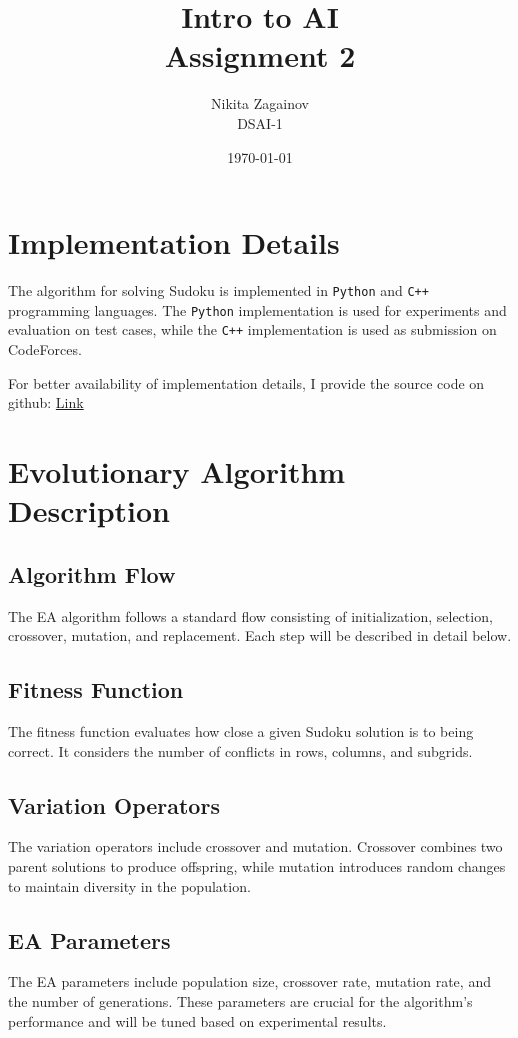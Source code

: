 \documentclass[12pt]{article}
\title{Intro to AI \\ Assignment 2}
\author{Nikita Zagainov \\ DSAI-1}
\date{\today}
\begin{document}
\maketitle

\section{Implementation Details}
The algorithm for solving Sudoku is implemented in
\texttt{Python} and \texttt{C++} programming languages. 
The \texttt{Python} implementation is used for experiments 
and evaluation on test cases, while the \texttt{C++} 
implementation is used as submission on CodeForces.

For better availability of implementation details,
I provide the source code on github: 
\href{https}{Link}

\section{Evolutionary Algorithm Description}
\subsection{Algorithm Flow}
The EA algorithm follows a standard flow 
consisting of initialization, selection, crossover, 
mutation, and replacement. Each step will be 
described in detail below.

\subsection{Fitness Function}
The fitness function evaluates how close a 
given Sudoku solution is to being correct. 
It considers the number of conflicts in rows, 
columns, and subgrids.

\subsection{Variation Operators}
The variation operators include crossover and 
mutation. Crossover combines two parent solutions 
to produce offspring, while mutation introduces 
random changes to maintain diversity in the 
population.

\subsection{EA Parameters}
The EA parameters include population size, 
crossover rate, mutation rate, and the number 
of generations. These parameters are crucial 
for the algorithm's performance and will be 
tuned based on experimental results.
\end{document}
